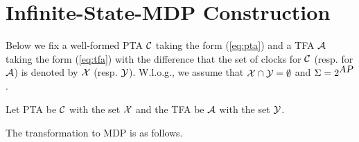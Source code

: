 \newcommand{\idx}[1]{\mbox{\sl index}
    \left (
        {#1}
    \right )
}

\newcommand{\successor}{
    \mbox{\sl succ} 
}
\section{Infinite-State-MDP Construction}


% 
% 
Below we fix a well-formed PTA $\mathcal{C}$ taking the form (\ref{eq:pta}) and a TFA $\mathcal{A}$ taking the form (\ref{eq:tfa}) with the difference that the set of clocks for $\mathcal{C}$ (resp. for $\mathcal{A}$) is denoted by $\mathcal{X}$ (resp. $\mathcal{Y}$).
W.l.o.g., we assume that $\mathcal{X} \cap \mathcal{Y} = \emptyset$ and $\Sigma=2^{\mbox{\sl AP}}$.

Let PTA be $\mathcal{C}$ with the set $\mathcal{X}$ and the TFA be $\mathcal{A}$ with the set $\mathcal{Y}$.

The transformation to MDP is as follows.

